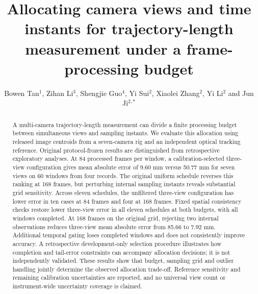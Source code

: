 \documentclass{iopjournal}
\begin{document}

\title{Allocating camera views and time instants for trajectory-length
measurement under a frame-processing budget}

\author{Bowen Tan$^1$,
Zihan Li$^3$,
Shengjie Guo$^4$,
Yi Sui$^2$,
Xiaolei Zhang$^2$,
Yi Li$^2$
and Jun Ji$^{2,*}$}








\begin{abstract}
A multi-camera trajectory-length measurement can divide a finite processing
budget between simultaneous views and sampling instants. We evaluate this
allocation using released image centroids from a seven-camera rig and an
independent optical tracking reference. Original protocol-frozen results are
distinguished from retrospective exploratory analyses. At 84 processed frames
per window, a calibration-selected three-view configuration gives mean absolute
error of 9.60 mm versus 50.77 mm for seven views on 60 windows from four records.
The original uniform schedule reverses this ranking at 168 frames, but
perturbing internal sampling instants reveals substantial grid sensitivity.
Across eleven schedules, the unfiltered three-view configuration has lower
error in ten cases at 84 frames and four at 168 frames. Fixed spatial
consistency checks restore lower three-view error in all eleven schedules
at both budgets, with all windows completed. At 168 frames on the original
grid, rejecting two internal observations reduces three-view mean absolute
error from 85.66 to 7.92 mm. Additional temporal gating loses completed windows
and does not consistently improve accuracy. A retrospective development-only
selection procedure illustrates how completion and tail-error constraints can
accompany allocation decisions; it is not independently validated. These
results show that budget, sampling grid and outlier handling jointly determine
the observed allocation trade-off. Reference sensitivity and remaining
calibration uncertainties are reported, and no universal view count or
instrument-wide uncertainty coverage is claimed.
\end{abstract}
\end{document}
